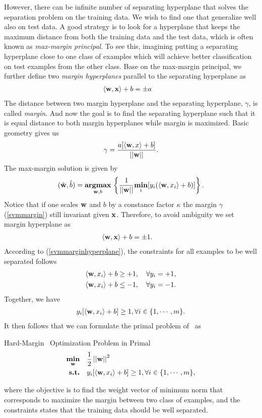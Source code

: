 However, there can be infinite number of separating hyperplane that solves the separation problem on the training data.
We wish to find one that generalize well also on test data.
A good strategy is to look for a hyperplane that keeps the maximum distance from both the training data and the test data, which is often known as \textit{max-margin principal}.
To see this, imagining putting a separating hyperplane close to one class of examples which will achieve better classification on test examples from the other class.
Base on the max-margin principal, we further define two \textit{margin hyperplanes} parallel to the separating hyperplane as
\begin{align*}
	\langle \mathbf {w}, \mathbf {x} \rangle + b &= \pm a
\end{align*}
The distance between two margin hyperplane and the separating hyperplane, $\gamma$, is called \textit{margin}.
And now the goal is to find the separating hyperplane such that it is equal distance to both margin hyperplanes while margin is maximized.
Basic geometry gives us
\begin{align}
	\gamma = \frac{a[\langle \mathbf {w}, x \rangle+b]}{\left|\left| \mathbf {w} \right|\right|}. \label{svmmargin}
\end{align}
The max-margin solution \citep{Bishop07} is given by
\begin{align*}
	(\hat{\mathbf {w}},\hat{b}) = \underset{\mathbf {w},b}{\textbf{argmax}}\,\left\{\frac{1}{\left|\left| \mathbf {w} \right|\right|}\underset{i}{\textbf{min}}[y_i(\langle \mathbf {w}, x_i \rangle+b)]\right\}.
\end{align*}
Notice that if one scales $\mathbf {w}$ and $b$ by a constance factor $\kappa$ the margin $\gamma$ (\ref{svmmargin}) still invariant given $\mathbf {x}$.
Therefore, to avoid ambiguity we set margin hyperplane as 
\begin{align}
	\langle \mathbf {w}, \mathbf {x} \rangle + b &= \pm 1.\label{svmmarginhyperplane}
\end{align}
According to (\ref{svmmarginhyperplane}), the constraints for all examples to be well separated follows
\begin{align*}
	\langle \mathbf {w}, x_i \rangle + b &\ge  +1, \quad \forall y_i=+1,\\
	\langle \mathbf {w}, x_i \rangle + b &\le -1, \quad \forall y_i=-1.
\end{align*}
Together, we have
\begin{align}
	y_i[\langle \mathbf {w}, x_i \rangle + b] \ge 1, \forall i\in\{1,\cdots,m\}. \label{hardsvmconstraints}
\end{align}
It then follows that we can formulate the primal problem of \svm\ as
\begin{definition}{Hard-Margin \svm\ Optimization Problem in Primal}\label{hardsvmprimal}
	\begin{align*}
		\underset{\mathbf {w}}{\textbf{min}} & \quad\frac{1}{2}\left|\left| \mathbf {w} \right|\right|^2\\
		\textbf{s.t.} & \quad y_i[\langle \mathbf {w}, x_i \rangle + b] \ge 1, \forall i\in\{1,\cdots,m\},
	\end{align*}
\end{definition}
where the objective is to find the weight vector of minimum norm that corresponds to maximize the margin between two class of examples, and the constraints states that the training data should be well separated.


